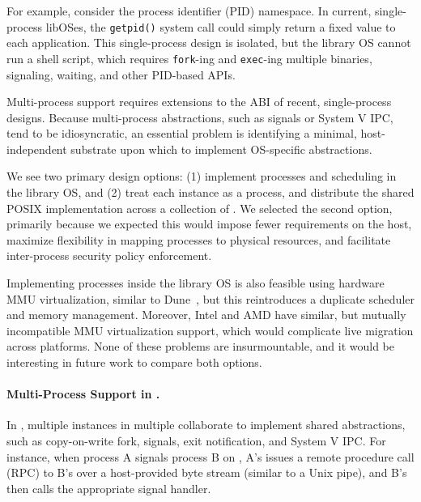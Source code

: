 
For example,
consider the process identifier (PID) namespace.
In current, single-process lib\-OSes, 
the {\tt getpid()} system call could simply return a fixed value to each application.
This  single-process design is isolated,
but the library OS cannot run a shell script, which requires {\tt fork}-ing and {\tt exec}-ing multiple binaries, signaling, waiting, and other
PID-based APIs.

\vspace{5pt}
Multi-process  support requires extensions to the \pal{} ABI of recent, single-process \libos{} designs.
Because multi-process abstractions, 
such as signals or System V IPC, 
tend to be idiosyncratic,
an essential problem is identifying a minimal, host-independent
substrate upon which 
to implement OS-specific abstractions.

We see two primary design options:
(1) implement processes and scheduling in 
the library OS, and (2) treat each \libos{} instance as a process, and distribute the 
shared POSIX implementation across a collection of \liboses{}.
We selected the second option, primarily because we expected this would impose fewer
requirements on the host, maximize flexibility in mapping processes 
to physical resources, and facilitate inter-process security policy enforcement. %

Implementing processes
inside the library OS is also feasible using 
hardware MMU virtualization, similar to Dune~\citep{belay12dune},
but this reintroduces a duplicate scheduler and memory management.
Moreover, Intel and AMD have similar, but mutually incompatible MMU virtualization support,
which would complicate live migration across platforms.
None of these problems are insurmountable, and it would be interesting in future
work to compare both options.

\paragraph{Multi-Process Support in \sysname{}.}
In \sysname{}, multiple \libos{} instances in multiple \picoprocs{} collaborate to 
implement shared abstractions, such as 
 copy-on-write fork, signals, exit notification,
and System V IPC.
For instance, when process A signals process B on \sysname{}, A's \libos{} issues
a remote procedure call (RPC) to B's \libos{} over a host-provided byte stream (similar to a Unix pipe),
and B's \libos{} then calls the appropriate signal handler.

